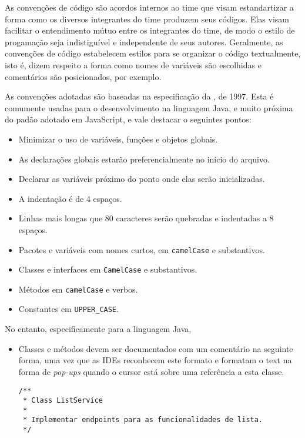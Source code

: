 As convenções de código são acordos internos ao time que visam
estandartizar a forma como os diversos integrantes do time produzem
seus códigos.  Elas visam facilitar o entendimento mútuo entre os
integrantes do time, de modo o estilo de progamação seja indistiguível
e independente de seus autores.  Geralmente, as convenções de código
estabelecem estilos para se organizar o código textualmente, isto é,
dizem respeito a forma como nomes de variáveis são escolhidas e
comentários são posicionados, por exemplo.

As convenções adotadas são baseadas na especificação da
\citeauthor{Oracle1997}, de 1997. Esta é comumente usadas para o
desenvolvimento na linguagem Java, e muito próxima do padão adotado em
JavaScript, e vale destacar o seguintes pontos:
\begin{itemize}
\item Minimizar o uso de variáveis, funções e objetos globais.
\item As declarações globais estarão preferencialmente no início do arquivo.
\item Declarar as variáveis próximo do ponto onde elas serão inicializadas.
\item A indentação é de 4 espaços.
\item Linhas mais longas que 80 caracteres serão quebradas e
  indentadas a 8 espaços.
\item Pacotes e variáveis com nomes curtos, em \texttt{camelCase} e substantivos.
\item Classes e interfaces em \texttt{CamelCase} e substantivos.
\item Métodos em \texttt{camelCase} e verbos.
\item Constantes em \texttt{UPPER\_CASE}.
\end{itemize}

No entanto, especificamente para a linguagem Java,
\begin{itemize}
\item Classes e métodos devem ser documentados com um comentário na
  seguinte forma, uma vez que as IDEs reconhecem este formato e
  formatam o text na forma de \emph{pop-ups} quando o cursor está
  sobre uma referência a esta classe.
\begin{verbatim}
/**
 * Class ListService
 *
 * Implementar endpoints para as funcionalidades de lista.
 */
\end{verbatim}
\end{itemize}
